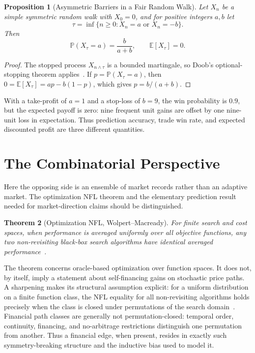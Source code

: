 \documentclass[aps,pra,reprint,superscriptaddress,amsmath,amssymb,floatfix]{revtex4-2}
\theoremstyle{plain}
\newtheorem{theorem}{Theorem}
\newtheorem{proposition}[theorem]{Proposition}
\theoremstyle{definition}
\theoremstyle{remark}
\begin{document}
\begin{proposition}[Asymmetric Barriers in a Fair Random Walk]
  \label{prop:optional}
  Let \(X_n\) be a simple symmetric random walk with \(X_0=0\), and for positive
  integers \(a,b\) let
  \[
    \tau=\inf\{n\geq0:X_n=a\text{ or }X_n=-b\}.
  \]
  Then
  \begin{equation}
    \mathbb{P}(X_\tau=a)=\frac{b}{a+b},
    \qquad
    \mathbb{E}[X_\tau]=0.
    \label{eq:gambler}
  \end{equation}
\end{proposition}

\begin{proof}
The stopped process \(X_{n\wedge\tau}\) is a bounded martingale, so Doob's
optional-stopping theorem applies~\cite{Doob1953}. If
\(p=\mathbb{P}(X_\tau=a)\), then
\(0=\mathbb{E}[X_\tau]=ap-b(1-p)\), which gives
\(p=b/(a+b)\).
\end{proof}

With a take-profit of \(a=1\) and a stop-loss of \(b=9\), the win probability
is \(0.9\), but the expected payoff is zero: nine frequent unit gains are
offset by one nine-unit loss in expectation. Thus prediction accuracy, trade
win rate, and expected discounted profit are three different quantities.

\section{The Combinatorial Perspective}
\label{sec:nfl}

Here the opposing side is an ensemble of market records rather than an
adaptive market. The optimization NFL theorem and the elementary prediction
result needed for market-direction claims should be distinguished.

\begin{theorem}[Optimization NFL, Wolpert--Macready]
  \label{thm:nfl}
  For finite search and cost spaces, when performance is averaged uniformly
  over all objective functions, any two non-revisiting black-box search
  algorithms have identical averaged
  performance~\cite{Wolpert:1997:NFL:2221336.2221408}.
\end{theorem}

The theorem concerns oracle-based optimization over function spaces. It does
not, by itself, imply a statement about self-financing gains on stochastic
price paths. A sharpening makes its structural assumption explicit: for a
uniform distribution on a finite function class, the NFL equality for all
non-revisiting algorithms holds precisely when the class is closed under
permutations of the search domain~\cite{SchumacherVoseWhitley2001}. Financial
path classes are generally not permutation-closed: temporal order, continuity,
financing, and no-arbitrage restrictions distinguish one permutation from
another. Thus a financial edge, when present, resides in exactly such
symmetry-breaking structure and the inductive bias used to model it.
\end{document}
